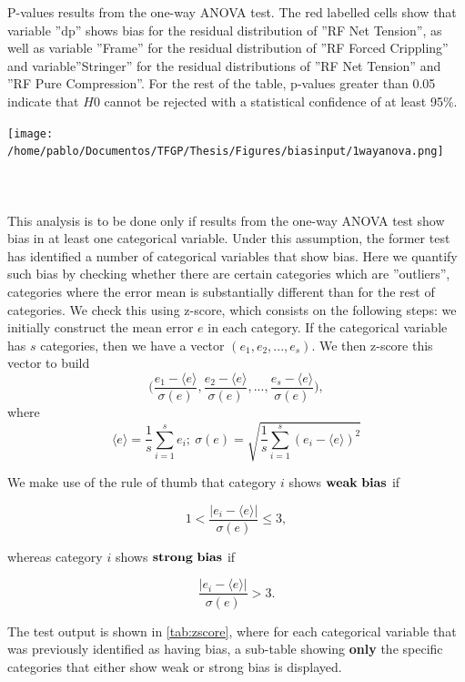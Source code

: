 \begin{table}
	\centering
	\caption{P-values results from the one-way ANOVA test. The red labelled cells show that variable ''dp'' shows bias for the residual distribution of ''RF Net Tension'', as well as variable ''Frame'' for the residual distribution of ''RF Forced Crippling'' and variable''Stringer'' for the residual distributions of ''RF Net Tension'' and ''RF Pure Compression''. For the rest of the table, p-values greater than 0.05 indicate that $H0$ cannot be rejected with a statistical confidence of at least 95\%.}
	\texttt{[image: /home/pablo/Documentos/TFGP/Thesis/Figures/biasinput/1wayanova.png]}
	\label{tab:1anova}
\end{table}
\FloatBarrier
%
\paragraph{ \\}
This analysis is to be done only if results from the one-way ANOVA test show bias in at least one categorical variable. Under this assumption, the former test has identified a number of categorical variables that show bias. Here we quantify such bias by checking whether there are certain categories which are ''outliers'', \ie categories where the error mean is substantially different than for the rest of categories. We check this using z-score\cite{kirkwood2010essential}, which consists on the following steps: we initially construct the mean error $e$ in each category. If the categorical variable has $s$ categories, then we have a vector $(e_1,e_2,...,e_s)$. We then z-score this vector to build
$$\bigg(\frac{e_1-\langle e \rangle}{\sigma(e)},\frac{e_2-\langle e \rangle}{\sigma(e)},...,\frac{e_s-\langle e \rangle}{\sigma(e)}\bigg),$$
where 
$$\langle e \rangle = \frac{1}{s}\sum_{i=1}^s e_i; \ \sigma(e)=\sqrt{\frac{1}{s}\sum_{i=1}^s (e_i-\langle e\rangle)^2}$$

We make use of the rule of thumb that category $i$ shows ${\bf weak\ bias}$ if

$$1<\frac{|e_i-\langle e \rangle|}{\sigma(e)}\leq3,$$

whereas category $i$ shows ${\bf strong\ bias}$ if 

$$\frac{|e_i-\langle e \rangle|}{\sigma(e)}>3.$$


The test output is shown in \autoref{tab:zscore}, where for each categorical variable that was previously identified as having bias, a sub-table showing \textbf{only} the specific categories that either show weak or strong bias is displayed.

